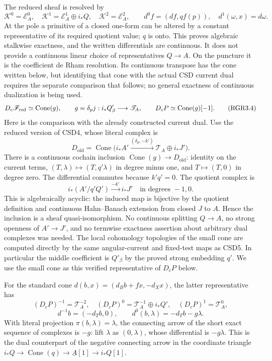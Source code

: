 The reduced sheaf is resolved by \[
 \mathscr K^0=\mathscr E_A^0,\quad
 \mathscr K^1=\mathscr E_A^1\oplus i_*Q,\quad
 \mathscr K^2=\mathscr E_A^2,\qquad
 d^0f=(df,qf(p)),\quad d^1(\omega,x)=d\omega.
 \tag{RGR3.3}
\] At the pole a primitive of a closed one-form can be altered by a
constant representative of its required quotient value; \(q\) is onto.
This proves algebraic stalkwise exactness, and the written differentials
are continuous. It does not provide a continuous linear choice of
representatives \(Q\to A\). On the puncture it is the coefficient de
Rham resolution. Its continuous transpose has the cone written below,
but identifying that cone with the actual CSD current dual requires the
separate comparison that follows; no general exactness of continuous
dualization is being used. \[
 D_c\mathscr F_{\rm red}\simeq\operatorname{Cone}(g),\qquad
 g=\delta_p j:i_*Q'_\beta\longrightarrow\mathscr T_A,
 \qquad D_cP\simeq\operatorname{Cone}(g)[-1].
 \tag{RGR3.4}
\] Here is the comparison with the already constructed current dual. Use
the reduced version of CSD4, whose literal complex is \[
 D_{\mathrm{old}}=\operatorname{Cone}\bigl(i_*A'
       \xrightarrow{(\delta_p,-k')}\mathscr T_A\oplus i_*J'\bigr).
 \tag{RGR3.4a}
\] There is a continuous cochain inclusion
\(\operatorname{Cone}(g)\to D_{\mathrm{old}}\): identity on the current
terms, \((T,\lambda)\mapsto(T,q'\lambda)\) in degree minus one, and
\(T\mapsto(T,0)\) in degree zero. The differential commutes because
\(k'q'=0\). The quotient complex is \[
 i_*(A'/q'Q')\xrightarrow{-k'}i_*J'
 \quad\text{in degrees }-1,0.
 \tag{RGR3.4b}
\] This is algebraically acyclic: the induced map is bijective by the
quotient definition and continuous Hahn--Banach extension from closed
\(J\) to \(A\). Hence the inclusion is a sheaf quasi-isomorphism. No
continuous splitting \(Q\to A\), no strong openness of \(A'\to J'\), and
no termwise exactness assertion about arbitrary dual complexes was
needed. The local cohomology topologies of the small cone are computed
directly by the same angular-current and fixed-test maps as CSD5. In
particular the middle coefficient is \(Q'_\beta\) by the proved strong
embedding \(q'\). We use the small cone as this verified representative
of \(D_cP\) below.

For the standard cone \(d(b,x)=(d_Bb+fx,-d_Xx)\), the latter
representative has \[
 (D_cP)^{-1}=\mathscr T_A^{-2},\quad
 (D_cP)^0=\mathscr T_A^{-1}\oplus i_*Q',\quad
 (D_cP)^1=\mathscr T_A^0,
\] \[
 d^{-1}b=(-d_Tb,0),\qquad
 d^0(b,\lambda)=-d_Tb-g\lambda.
 \tag{RGR3.5}
\] With literal projection \(\pi(b,\lambda)=\lambda\), the connecting
arrow of the short exact sequence of complexes is \(-g\): lift
\(\lambda\) as \((0,\lambda)\), whose differential is \(-g\lambda\).
This is the dual counterpart of the negative connecting arrow in the
coordinate triangle
\(i_*Q\to\operatorname{Cone}(q)\to\underline A[1]\to i_*Q[1]\).

